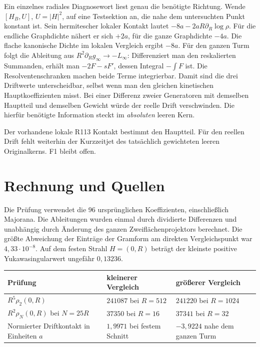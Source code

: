 \documentclass[11pt,a4paper]{article}
\begin{document}
Ein einzelnes radiales Diagnosewort liest genau die benötigte Richtung. Wende $[H_B,U]$, $U=|H|^2$, auf eine Testsektion an, die nahe dem untersuchten Punkt konstant ist. Sein hermitescher lokaler Kontakt lautet $-8a-2aR\partial_R\log\rho$. Für die endliche Graphdichte nähert er sich $+2a$, für die ganze Graphdichte $-4a$. Die flache kanonische Dichte im lokalen Vergleich ergibt $-8a$. Für den ganzen Turm folgt die Ableitung aus $R^2\partial_R g_\infty\to-L_\infty$: Differenziert man den reskalierten Summanden, erhält man $-2F-sF'$, dessen Integral $-\int F$ ist. Die Resolventenschranken machen beide Terme integrierbar. Damit sind die drei Driftwerte unterscheidbar, selbst wenn man den gleichen kinetischen Hauptkoeffizienten misst. Bei einer Differenz zweier Generatoren mit demselben Hauptteil und demselben Gewicht würde der reelle Drift verschwinden. Die hierfür benötigte Information steckt im \emph{absoluten} leeren Kern.

Der vorhandene lokale R113 Kontakt bestimmt den Hauptteil. Für den reellen Drift fehlt weiterhin der Kurzzeitjet des tatsächlich gewichteten leeren Originalkerns. F1 bleibt offen.

\clearpage
\section*{Rechnung und Quellen}
Die Prüfung verwendet die 96 ursprünglichen Koeffizienten, einschließlich Majorana. Die Ableitungen wurden einmal durch dividierte Differenzen und unabhängig durch Änderung des ganzen Zweiflächenprojektors berechnet. Die größte Abweichung der Einträge der Gramform am direkten Vergleichspunkt war $4{,}33\cdot10^{-8}$. Auf dem festen Strahl $H=(0,R)$ beträgt der kleinste positive Yukawasingularwert ungefähr $0{,}13236$.

\begin{center}
\begin{tabularx}{\textwidth}{@{}>{\raggedright\arraybackslash}p{52mm}XX@{}}
\toprule
Prüfung & kleinerer Vergleich & größerer Vergleich\\
\midrule
$R^5\rho_2(0,R)$ & $241087$ bei $R=512$ & $241220$ bei $R=1024$\\
$R^2\rho_N(0,R)$ bei $N=25R$ & $37350$ bei $R=16$ & $37341$ bei $R=32$\\
Normierter Driftkontakt in Einheiten $a$ & $1{,}9971$ bei festem Schnitt & $-3{,}9224$ nahe dem ganzen Turm\\
\bottomrule
\end{tabularx}
\end{center}
\end{document}
